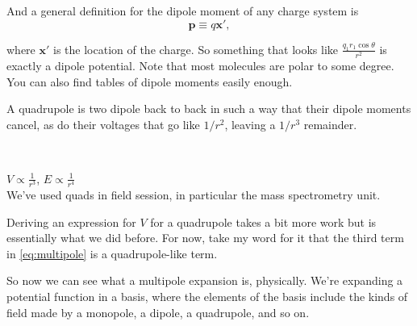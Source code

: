 \documentclass{article}
\begin{document}
\vspace{1em}

And a general definition for the dipole moment of any charge system is
\begin{equation*}
    \bm{p} \equiv q \bm{x'},
\end{equation*}

where $\bm{x'}$ is the location of the charge. So something that looks like $\displaystyle \frac{q_1 r_1 \cos{\theta}}{r^2}$ is exactly a dipole potential. Note that most molecules are polar to some degree. You can also find tables of dipole moments easily enough.

\vspace{1em}

A quadrupole is two dipole back to back in such a way that their dipole moments cancel, as do their voltages that go like $1/r^2$, leaving a $1/r^3$ remainder.

\begin{minipage}{0.5\textwidth}
\begin{figure}[H]
\centering
{}
\end{figure}
\end{minipage}
~
\begin{minipage}{0.4\textwidth}
    $V \propto \frac{1}{r^3}$, \hspace{1em} $E \propto \frac{1}{r^4}$ \\[1em]
    We've used quads in field session, in particular the mass spectrometry unit.
\end{minipage}

\vspace{1em}

Deriving an expression for $V$ for a quadrupole takes a bit more work but is essentially what we did before. For now, take my word for it that the third term in \ref{eq:multipole} is a quadrupole-like term.

\vspace{1em}

So now we can see what a multipole expansion is, physically. We're expanding a potential function in a basis, where the elements of the basis include the kinds of field made by a monopole, a dipole, a quadrupole, and so on.
\end{document}
